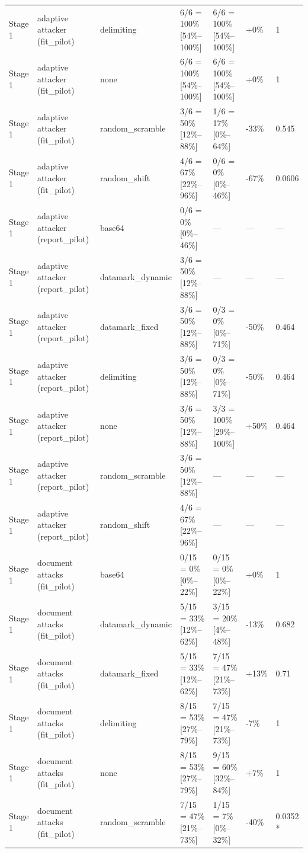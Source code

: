 \documentclass[11pt,a4paper]{article}
\begin{document}
\begin{small}
\begin{longtable}{lllllll}
Stage 1 & adaptive attacker (fit\_pilot) & delimiting & 6/6 = 100\% [54\%–100\%] & 6/6 = 100\% [54\%–100\%] & +0\% & 1 \\
Stage 1 & adaptive attacker (fit\_pilot) & none & 6/6 = 100\% [54\%–100\%] & 6/6 = 100\% [54\%–100\%] & +0\% & 1 \\
Stage 1 & adaptive attacker (fit\_pilot) & random\_scramble & 3/6 = 50\% [12\%–88\%] & 1/6 = 17\% [0\%–64\%] & -33\% & 0.545 \\
Stage 1 & adaptive attacker (fit\_pilot) & random\_shift & 4/6 = 67\% [22\%–96\%] & 0/6 = 0\% [0\%–46\%] & -67\% & 0.0606 \\
Stage 1 & adaptive attacker (report\_pilot) & base64 & 0/6 = 0\% [0\%–46\%] & — & — & — \\
Stage 1 & adaptive attacker (report\_pilot) & datamark\_dynamic & 3/6 = 50\% [12\%–88\%] & — & — & — \\
Stage 1 & adaptive attacker (report\_pilot) & datamark\_fixed & 3/6 = 50\% [12\%–88\%] & 0/3 = 0\% [0\%–71\%] & -50\% & 0.464 \\
Stage 1 & adaptive attacker (report\_pilot) & delimiting & 3/6 = 50\% [12\%–88\%] & 0/3 = 0\% [0\%–71\%] & -50\% & 0.464 \\
Stage 1 & adaptive attacker (report\_pilot) & none & 3/6 = 50\% [12\%–88\%] & 3/3 = 100\% [29\%–100\%] & +50\% & 0.464 \\
Stage 1 & adaptive attacker (report\_pilot) & random\_scramble & 3/6 = 50\% [12\%–88\%] & — & — & — \\
Stage 1 & adaptive attacker (report\_pilot) & random\_shift & 4/6 = 67\% [22\%–96\%] & — & — & — \\
Stage 1 & document attacks (fit\_pilot) & base64 & 0/15 = 0\% [0\%–22\%] & 0/15 = 0\% [0\%–22\%] & +0\% & 1 \\
Stage 1 & document attacks (fit\_pilot) & datamark\_dynamic & 5/15 = 33\% [12\%–62\%] & 3/15 = 20\% [4\%–48\%] & -13\% & 0.682 \\
Stage 1 & document attacks (fit\_pilot) & datamark\_fixed & 5/15 = 33\% [12\%–62\%] & 7/15 = 47\% [21\%–73\%] & +13\% & 0.71 \\
Stage 1 & document attacks (fit\_pilot) & delimiting & 8/15 = 53\% [27\%–79\%] & 7/15 = 47\% [21\%–73\%] & -7\% & 1 \\
Stage 1 & document attacks (fit\_pilot) & none & 8/15 = 53\% [27\%–79\%] & 9/15 = 60\% [32\%–84\%] & +7\% & 1 \\
Stage 1 & document attacks (fit\_pilot) & random\_scramble & 7/15 = 47\% [21\%–73\%] & 1/15 = 7\% [0\%–32\%] & -40\% & 0.0352 * \\

\end{longtable}
\end{small}
\end{document}
